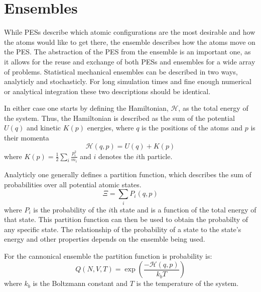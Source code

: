 \graphicspath{{./pes_e/figures/}}
\section{Ensembles} \label{sec:ens}
While PESs describe which atomic configurations are the most desirable and how the atoms would like to get there, the ensemble describes how the atoms move on the PES.
The abstraction of the PES from the ensemble is an important one, as it allows for the reuse and exchange of both PESs and ensembles for a wide array of problems.
Statistical mechanical ensembles can be described in two ways, analyticly and stochasticly.
For long simulation times and fine enough numerical or analytical integration these two descriptions should be identical.

In either case one starts by defining the Hamiltonian, $\mathcal{H}$, as the total energy of the system.
Thus, the Hamiltonian is described as the sum of the potential $U(q)$ and kinetic $K(p)$ energies, where $q$ is the positions of the atoms and $p$ is their momenta
\begin{equation} \label{Hamiltonian}
  \mathcal{H}(q, p) = U(q) + K(p)
\end{equation}
\noindent where $K(p) = \frac{1}{2}\sum_{i} \frac{p_{i}^{2}}{m_{i}}$ and $i$ denotes the $i$th particle.

Analyticly one generally defines a partition function, which describes the sum of probabilities over all potential atomic states.
\begin{equation}
\Xi = \sum_{i} P_{i}(q, p)
\end{equation}
where $P_{i}$ is the probability of the $i$th state and is a function of the total energy of that state.
This partition function can then be used to obtain the probabilty of any specific state.
The relationship of the probability of a state to the state's energy and other properties depends on the ensemble being used.

For the cannonical ensemble the partition function is probability is:
\begin{equation}
Q(N, V, T) = \exp(\frac{-\mathcal{H}(q, p)}{k_{b}T})
\end{equation}
where $k_{b}$ is the Boltzmann constant and $T$ is the temperature of the system. \cite{McQuarrie2000}

